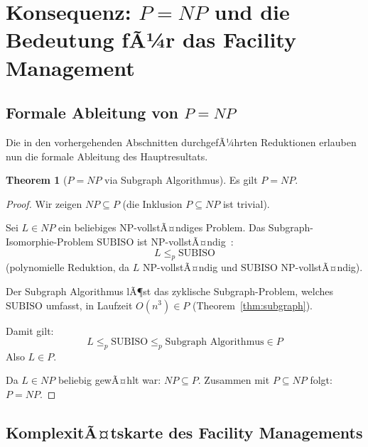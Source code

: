﻿\documentclass[a4paper,12pt]{article}
\theoremstyle{definition}
\newtheorem{theorem}{Theorem}[section]
\begin{document}
\section{Konsequenz: \texorpdfstring{$P = NP$}{P = NP} und die Bedeutung fÃ¼r das Facility Management}
\label{sec:pnp}

\subsection{Formale Ableitung von \texorpdfstring{$P = NP$}{P = NP}}

Die in den vorhergehenden Abschnitten durchgefÃ¼hrten Reduktionen erlauben nun
die formale Ableitung des Hauptresultats.

\begin{theorem}[$P = NP$ via Subgraph Algorithmus]
\label{thm:pnp}
Es gilt $P = NP$.
\end{theorem}

\begin{proof}
Wir zeigen $NP \subseteq P$ (die Inklusion $P \subseteq NP$ ist trivial).

Sei $L \in NP$ ein beliebiges NP-vollstÃ¤ndiges Problem.
Das Subgraph-Isomorphie-Problem $\mathrm{SUBISO}$ ist NP-vollstÃ¤ndig~\cite{garey1979}:
\[
    L \leq_p \mathrm{SUBISO}
\]
(polynomielle Reduktion, da $L$ NP-vollstÃ¤ndig und $\mathrm{SUBISO}$ NP-vollstÃ¤ndig).

Der Subgraph Algorithmus lÃ¶st das zyklische Subgraph-Problem, welches
$\mathrm{SUBISO}$ umfasst, in Laufzeit $O(n^3) \in P$
(Theorem~\ref{thm:subgraph}).

Damit gilt:
\[
    L \leq_p \mathrm{SUBISO} \leq_p \text{Subgraph Algorithmus} \in P
\]
Also $L \in P$.

Da $L \in NP$ beliebig gewÃ¤hlt war: $NP \subseteq P$.
Zusammen mit $P \subseteq NP$ folgt: $P = NP$.
\end{proof}

\subsection{KomplexitÃ¤tskarte des Facility Managements}
\end{document}
